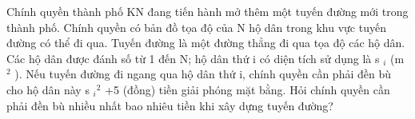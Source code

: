 Chính quyền thành phố KN đang tiến hành mở thêm một tuyến đường mới trong thành phố. Chính quyền có bản đồ tọa độ của N hộ dân trong khu vực tuyến đường có thể đi qua. Tuyến đường là một đường thẳng đi qua tọa độ các hộ dân. Các hộ dân được đánh số từ 1 đến N; hộ dân thứ i có diện tích sử dụng là s   $_    i   $   (m   $^    2   $   ). Nếu tuyến đường đi ngang qua hộ dân thứ i, chính quyền cần phải đền bù cho hộ dân này s   $_    i   $$^    2   $   +5 (đồng) tiền giải phóng mặt bằng. Hỏi chính quyền cần phải đền bù nhiều nhất bao nhiêu tiền khi xây dựng tuyến đường?
